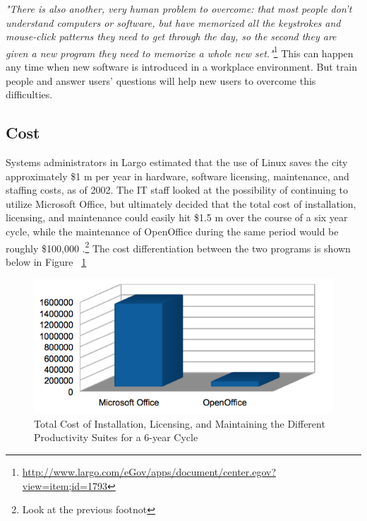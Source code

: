 \textit{"There is also another, very human problem to overcome: that most people don't understand computers or software, but have memorized all the keystrokes and mouse-click patterns they need to get through the day, so the second they are given a new program they need to memorize a whole new set."}\footnote{\url{http://www.largo.com/eGov/apps/document/center.egov?view=item;id=1793}} This can happen any time when new software is introduced in a workplace environment. But train people and answer users' questions will help new users to overcome this difficulties.

\subsection{Cost}
Systems administrators in Largo estimated that the use of Linux saves the city approximately \$1 m per year in hardware, software licensing, maintenance, and staffing costs, as of 2002. The IT staff looked at the possibility of continuing to utilize Microsoft Office, but ultimately decided that the total cost of installation, licensing, and maintenance could easily hit \$1.5 m over the course of a six year cycle, while the maintenance of OpenOffice during the same period would be roughly \$100,000 .\footnote{Look at the previous footnot} 
The cost differentiation between the two programs is shown below in Figure ~\ref{fig:Largo_cost} 
\begin{figure}
\begin{center}
    \includegraphics[scale=0.9]{img/largocost.png}   
\end{center}
 \caption[Largo Office Cost ]{Total Cost of Installation, Licensing, and Maintaining the Different Productivity Suites for a 6-year Cycle}
    \label {fig:Largo_cost}

\end{figure}


